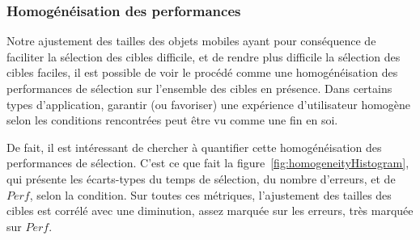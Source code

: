 	\subsubsection{Homogénéisation des performances}
	Notre ajustement des tailles des objets mobiles ayant pour conséquence de faciliter la sélection des cibles difficile, et de rendre plus difficile la sélection des cibles faciles, il est possible de voir le procédé comme une homogénéisation des performances de sélection sur l'ensemble des cibles en présence. Dans certains types d'application, garantir (ou favoriser) une expérience d'utilisateur homogène selon les conditions rencontrées peut être vu comme une fin en soi.
	
	De fait, il est intéressant de chercher à quantifier cette homogénéisation des performances de sélection. C'est ce que fait la figure~\ref{fig:homogeneityHistogram}, qui présente les écarts-types du temps de sélection, du nombre d'erreurs, et de $Perf$, selon la condition. Sur toutes ces métriques, l'ajustement des tailles des cibles est corrélé avec une diminution, assez marquée sur les erreurs, très marquée sur $Perf$.

